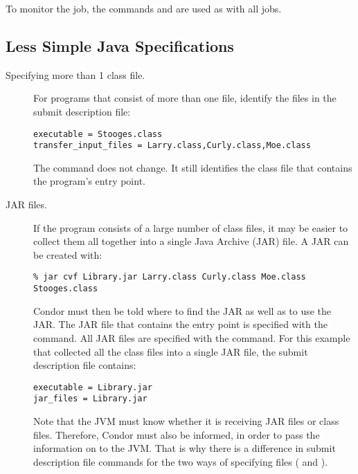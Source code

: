To monitor the job, the commands  and 
are used as with all jobs.

\subsection{Less Simple Java Specifications}

\begin{description}
\item[Specifying more than 1 class file.]
For programs that 
consist of more than one  file,
identify the files in the submit description file:

\begin{verbatim}
executable = Stooges.class
transfer_input_files = Larry.class,Curly.class,Moe.class
\end{verbatim}

The  command does not change.
It still identifies the class file that contains the program's
entry point.

\item[JAR files.]
If the program consists of a large number of class files,
it may be easier to collect them all together into
a single Java Archive (JAR) file.
A JAR can be created with:

\footnotesize
\begin{verbatim}
% jar cvf Library.jar Larry.class Curly.class Moe.class Stooges.class
\end{verbatim}
\normalsize

Condor must then be told where to find the JAR as well
as to use the JAR. 
The JAR file that contains the entry point
is specified with the  command.
All JAR files are specified with the 
command.
For this example that collected all the class files
into a single JAR file, the submit description file contains:

\begin{verbatim}
executable = Library.jar
jar_files = Library.jar
\end{verbatim}

Note that the JVM must know whether it is receiving JAR files
or class files.
Therefore, Condor must also be informed, in order to pass the
information on to the JVM.
That is why there is a difference in submit description file commands
for the two ways of specifying files (
and ).


\end{description}
